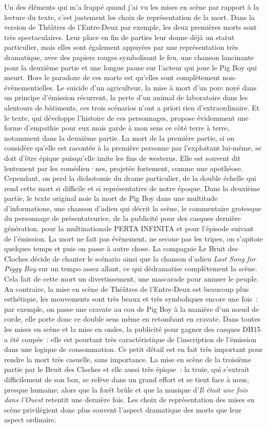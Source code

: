 \documentclass[
]{article}
\begin{document}
Un des éléments qui m'a frappé quand j'ai vu les mises en scène par rapport à la lecture du texte, c'est justement les choix de représentation de la mort. Dans la version de Théâtres de l'Entre-Deux par exemple, les deux premières morts sont très spectaculaires. Leur place en fin de parties leur donne déjà un statut particulier, mais elles sont également appuyées par une représentation très dramatique, avec des papiers rouges symbolisant le feu, une chanson lancinante pour la deuxième partie et une longue pause sur l'acteur qui joue le Pig Boy qui meurt. Hors le paradoxe de ces morts est qu'elles sont complètement non-évènementielles. Le suicide d'un agriculteur, la mise à mort d'un porc noyé dans un principe d'émission récurrent, la perte d'un animal de laboratoire dans les alentours de bâtiments, ces trois scénarios n'ont a priori rien d'extraordinaire. Et le texte, qui développe l'histoire de ces personnages, propose évidemment une forme d'empathie pour eux mais garde à mon sens ce côté terre à terre, notamment dans la deuxième partie. La mort de la première partie, si on considère qu'elle est racontée à la première personne par l'exploitant lui-même, se doit d'être épique puisqu'elle imite les fins de westerns. Elle est souvent dit lentement par les comédien·nes, projetée fortement, comme une apothéose. Cependant, on perd la dichotomie du drame particulier, de la double échelle qui rend cette mort si difficile et si représentative de notre époque. Dans la deuxième partie, le texte original noie la mort de Pig Boy dans une multitude d'informations, une chanson d'adieu qui décrit la scène, le commentaire grotesque du personnage de présentateurice, de la publicité pour des casques dernière génération, pour la multinationale PERTA INFINITA et pour l'épisode suivant de l'émission. La mort ne fait pas évènement, ne secoue pas les tripes, on s'apitoie quelques temps et puis on passe à autre chose. La compagnie Le Bruit des Cloches décide de chanter le scénario ainsi que la chanson d'adieu \emph{Last Song for Piggy Boy} sur un tempo assez allant, ce qui dédramatise complètement la scène. Cela fait de cette mort un divertissement, une mascarade pour amuser le peuple. Au contraire, la mise en scène de Théâtres de l'Entre-Deux est beaucoup plus esthétique, les mouvements sont très beaux et très symboliques encore une fois~: par exemple, on passe une cravate au cou de Pig Boy à la manière d'un nœud de corde, elle porte donc ce double sens même en retombant en cravate. Dans toutes les mises en scène et la mise en ondes, la publicité pour gagner des casques DH15 a été coupée~: elle est pourtant très caractéristique de l'inscription de l'émission dans une logique de consommation. Ce petit détail est en fait très important pour rendre la mort très casuelle, sans importance. La mise en scène de la troisième partie par le Bruit des Cloches et elle aussi très épique~: la truie, qui s'extrait difficilement de son box, se relève dans un grand effort et se tient face à nous, presque humaine, alors que la forêt brûle et que la musique d'\emph{Il était une fois dans l'Ouest} retentit une dernière fois. Les choix de représentation des mises en scène privilégient donc plus souvent l'aspect dramatique des morts que leur aspect ordinaire.
\end{document}
